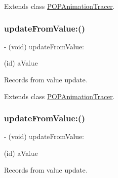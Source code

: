 Extends class \mbox{\hyperlink{interface_p_o_p_animation_tracer_aba012bff58a203420d1adf3e922491e0}{P\+O\+P\+Animation\+Tracer}}.

\mbox{\label{category_p_o_p_animation_tracer_07_internal_08_aa5cc867da95a73d3254f38a86281233a}} 
\subsubsection{\texorpdfstring{update\+From\+Value\+:()}{updateFromValue:()}\hspace{0.1cm}{\footnotesize\ttfamily [1/2]}}
{\footnotesize\ttfamily -\/ (void) update\+From\+Value\+: \begin{DoxyParamCaption}\item[{(id)}]{a\+Value }\end{DoxyParamCaption}}

Records from value update. 

Extends class \mbox{\hyperlink{interface_p_o_p_animation_tracer_aa5cc867da95a73d3254f38a86281233a}{P\+O\+P\+Animation\+Tracer}}.

\mbox{\label{category_p_o_p_animation_tracer_07_internal_08_aa5cc867da95a73d3254f38a86281233a}} 
\subsubsection{\texorpdfstring{update\+From\+Value\+:()}{updateFromValue:()}\hspace{0.1cm}{\footnotesize\ttfamily [2/2]}}
{\footnotesize\ttfamily -\/ (void) update\+From\+Value\+: \begin{DoxyParamCaption}\item[{(id)}]{a\+Value }\end{DoxyParamCaption}}

Records from value update. 

